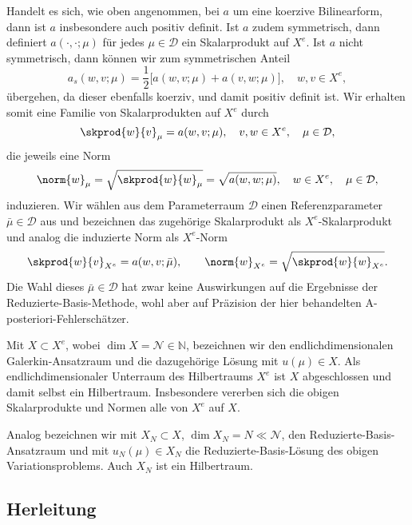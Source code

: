 Handelt es sich, wie oben angenommen, bei $a$ um eine koerzive Bilinearform, dann ist $a$ insbesondere auch positiv definit.
Ist $a$ zudem symmetrisch, dann definiert $a(\cdot, \cdot; \mu)$ für jedes $\mu \in \mathcal D$ ein Skalarprodukt auf $X^e$.
Ist $a$ nicht symmetrisch, dann können wir zum symmetrischen Anteil
\begin{equation}
    a_s(w, v; \mu) = \frac{1}{2} \Big[ a(w, v; \mu) + a(v, w; \mu) \Big], \quad w, v \in X^e,
\end{equation}
übergehen, da dieser ebenfalls koerziv, und damit positiv definit ist.
Wir erhalten somit eine Familie von Skalarprodukten auf $X^e$ durch
\begin{equation}
    \skprod{w}{v}_{\mu} = a(w, v; \mu), \quad v, w \in X^e, \quad \mu \in \mathcal D,
\end{equation}
die jeweils eine Norm
\begin{equation}
    \norm{w}_{\mu} = \sqrt{\skprod{w}{w}_{\mu}} = \sqrt{a(w, w; \mu)}, \quad w \in X^e, \quad \mu \in \mathcal D,
\end{equation}
induzieren.
Wir wählen aus dem Parameterraum $\mathcal D$ einen Referenzparameter $\bar \mu \in \mathcal D$ aus und bezeichnen das zugehörige Skalarprodukt als $X^e$-Skalarprodukt und analog die induzierte Norm als $X^e$-Norm
\begin{equation}
    \skprod{w}{v}_{X^e} = a(w, v; \bar \mu),
    \qquad
    \norm{w}_{X^e} = \sqrt{\skprod{w}{w}_{X^e}}.
\end{equation}
Die Wahl dieses $\bar \mu \in \mathcal D$ hat zwar keine Auswirkungen auf die Ergebnisse der Reduzierte-Basis-Methode, wohl aber auf Präzision der hier behandelten A-posteriori-Fehlerschätzer.

Mit $X \subset X^e$, wobei $\dim X = \mathcal N \in \mathbb{N}$, bezeichnen wir den endlichdimensionalen Galerkin-Ansatzraum und die dazugehörige Lösung mit $u(\mu) \in X$.
Als endlichdimensionaler Unterraum des Hilbertraums $X^e$ ist $X$ abgeschlossen und damit selbst ein Hilbertraum.
Insbesondere vererben sich die obigen Skalarprodukte und Normen alle von $X^e$ auf $X$.

Analog bezeichnen wir mit $X_N \subset X$, $\dim X_N = N \ll \mathcal N$, den Reduzierte-Basis-Ansatzraum und mit $u_N(\mu) \in X_N$ die Reduzierte-Basis-Lösung des obigen Variationsproblems.
Auch $X_N$ ist ein Hilbertraum.

\subsection{Herleitung} %
\label{sub:herleitung}

